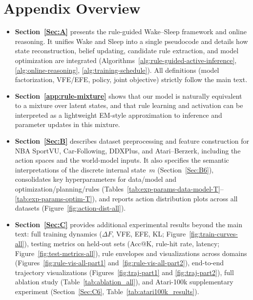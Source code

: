 \documentclass{article} %
\newcommand{\revise}[1]{#1}
\begin{document}
\section*{Appendix Overview}
\begin{itemize}
  \item \textbf{Section~\ref{Sec:A}} presents the rule-guided Wake–Sleep framework and online reasoning. 
  It unifies Wake and Sleep into a single pseudocode and details how state reconstruction, belief updating, 
  candidate rule extraction, and model optimization are integrated 
  (Algorithms~\ref{alg:rule-guided-active-inference}, \ref{alg:online-reasoning}, \ref{alg:training-schedule}). 
  All definitions (model factorization, VFE/EFE, policy, joint objective) strictly follow the main text.
  \revise{\item \textbf{Section~\ref{app:rule-mixture}} shows that our model is naturally equivalent to a mixture over latent states, and that rule learning and activation can be interpreted as a lightweight EM-style approximation to inference and parameter updates in this mixture.}
  
  \item \textbf{Section~\ref{Sec:B}} describes dataset preprocessing and feature construction for 
  NBA SportVU, Car-Following, DDXPlus, and Atari–Berzerk, including the action spaces and the world-model inputs. 
  It also specifies the semantic interpretations of the discrete internal state~$m$ (Section~\ref{Sec:B6}), 
  consolidates key hyperparameters for data/model and optimization/planning/rules 
  (Tables~\ref{tab:exp-params-data-model-T}--\ref{tab:exp-params-optim-T}), 
  and reports action distribution plots across all datasets (Figure~\ref{fig:action-dist-all}).

  \item \textbf{Section~\ref{Sec:C}} provides additional experimental results beyond the main text: full training dynamics (\(\Delta F\), VFE, EFE, KL; Figure~\ref{fig:train-curves-all}), 
  testing metrics on held-out sets (Acc@K, rule-hit rate, latency; Figure~\ref{fig:test-metrics-all}), 
  rule envelopes and visualizations across domains
  (Figures~\ref{fig:rule-vis-all-part1} and~\ref{fig:rule-vis-all-part2}),
  end-to-end trajectory visualizations
  (Figures~\ref{fig:traj-part1} and \ref{fig:traj-part2}), 
  full ablation study (Table~\ref{tab:ablation_all}), 
  \revise{and Atari-100k supplementary experiment (Section~\ref{Sec:C6}, Table~\ref{tab:atari100k_results}).}


\end{itemize}
\end{document}
